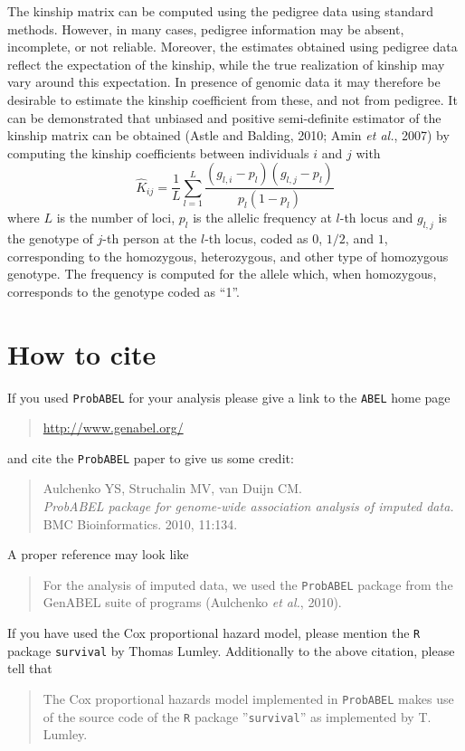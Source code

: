 \documentclass[12pt,a4paper]{article}
\begin{document}
The kinship matrix can be computed using the pedigree data using standard methods.
However, in many cases, pedigree information may be absent, incomplete, or not
reliable. Moreover, the estimates obtained using pedigree data reflect the
expectation of the kinship, while the true realization of kinship may vary
around this expectation. In presence of genomic data it may therefore be
desirable to estimate the kinship coefficient from these, and not from pedigree.
It can be demonstrated that unbiased and positive semi-definite estimator
of the kinship matrix can be obtained (Astle and Balding, 2010; Amin \emph{et al.}, 2007)
by computing the kinship coefficients between individuals $i$ and $j$ with
$$
\hat{K}_{ij} = \frac{1}{L} \sum_{l=1}^L \frac{ (g_{l,i} - p_l) (g_{l,j} - p_l) }{ p_l (1-p_l) }
$$
where $L$ is the number of loci, $p_l$ is the allelic frequency at $l$-th locus
and $g_{l,j}$ is the genotype of $j$-th person at the $l$-th locus, coded
as $0$, $1/2$, and $1$, corresponding to the homozygous, heterozygous, and
other type of homozygous genotype. The frequency is computed for the allele
which, when homozygous, corresponds to the genotype coded as ``1''.


\section{How to cite}

If you used \texttt{ProbABEL} for
your analysis please give a link to the \texttt{ABEL} home
page

\begin{quote}
\url{http://www.genabel.org/}
\end{quote}
and cite the \texttt{ProbABEL} paper to give us some credit:
\begin{quote}
Aulchenko YS, Struchalin MV, van Duijn CM.\\
\emph{ProbABEL package for genome-wide association analysis of imputed data.}\\
BMC Bioinformatics. 2010, 11:134.
\end{quote}
A proper reference may look like
\begin{quote}
For the analysis of imputed data, we used the \texttt{ProbABEL} package
from the GenABEL suite of programs (Aulchenko \emph{et al.}, 2010).
\end{quote}

If you have used the Cox proportional hazard model, please mention the
\texttt{R} package \texttt{survival} by Thomas Lumley. Additionally
to the above citation, please tell that
\begin{quote}
The Cox proportional hazards model implemented in \texttt{ProbABEL}
makes use of the source code of the \texttt{R} package ''\texttt{survival}''
as implemented by T. Lumley.
\end{quote}
\end{document}
